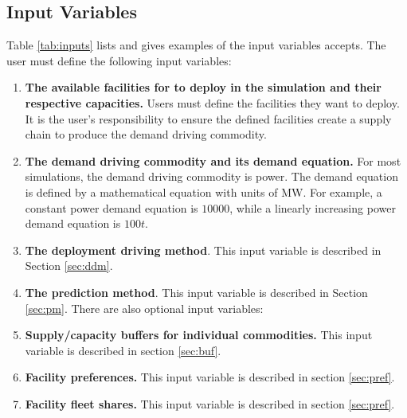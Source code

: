 \subsection{Input Variables}
Table \ref{tab:inputs} lists and gives examples of the input 
variables \deploy accepts. 
The user must define the following input variables:
\begin{enumerate}
\item \textbf{The available facilities for \deploy to deploy in the simulation and their respective capacities.}
Users must define the facilities they want \deploy to deploy. It is the user's responsibility to 
ensure the defined facilities create a supply chain to produce the demand driving commodity.
\item \textbf{The demand driving commodity and its demand equation.} For most simulations, the demand driving 
commodity is power. The demand equation is defined by a mathematical equation with units of MW. For example, 
a constant power demand equation is $10000$, while a linearly increasing power demand equation is $100t$.
\item \textbf{The deployment driving method}. This input variable is described in Section \ref{sec:ddm}. 
\item \textbf{The prediction method}. This input variable is described in Section \ref{sec:pm}.
There are also optional input variables: 
\item \textbf{Supply/capacity buffers for individual commodities.} This input variable is described in 
section \ref{sec:buf}.
\item \textbf{Facility preferences.} This input variable is described in section \ref{sec:pref}.
\item \textbf{Facility fleet shares.} This input variable is described in section \ref{sec:pref}.
\end{enumerate}

